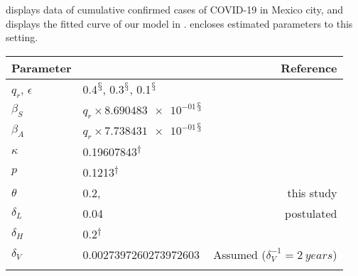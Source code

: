  displays data of cumulative confirmed cases
of COVID-19 in Mexico city, and  displays 
the fitted curve
of our model in .
 encloses estimated parameters to this
setting.

  \begin{table*}
    \centering
    \begin{tabular}{@{}llr@{}}
    \toprule
        Parameter
        &   \centering{Median}
        &   Reference
        \\
        \midrule
          $q_r$, $\epsilon$
            &
              \num{.4}\textsuperscript{$\mathsection$}, 
              \num{.3}\textsuperscript{$\mathsection$}, 
              \num{.1}\textsuperscript{$\mathsection$}
            &
              
        \\
            $\beta_S$
            & $q_r \times \num{8.690483e-01}$\textsuperscript{$\mathsection$}
            & 
        \\
            $\beta_A$
            & $q_r \times \num{7.738431e-01}$\textsuperscript{$\mathsection$}
            & 

        \\
            $\kappa$
            & \num{0.19607843}\textsuperscript{$\dagger$}
            & 
        \\
            $p$
            & \num{0.1213}\textsuperscript{$\dagger$}
            & 
        \\
          $\theta$
          & \num{0.2},
          & this study
        \\
          $\delta_L$
          & \num{0.04}
          & postulated
        \\
            $\delta_H$
            &\num{0.2}\textsuperscript{$\dagger$}
            & 
        \\
          $\delta_V$
          &\num{ 0.0027397260273972603}
          & Assumed ($\delta_V ^{-1} = \SI{2}{years}$)
        \\
        &&


\end{tabular}
\end{table*}
